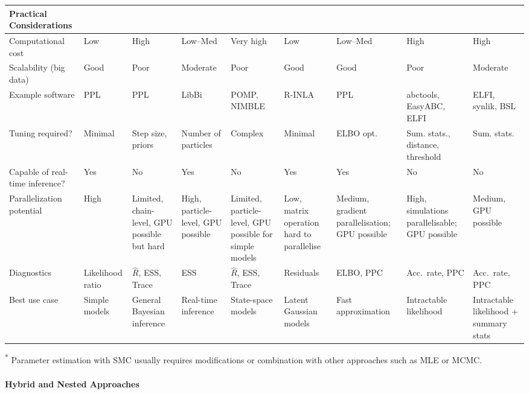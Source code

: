\documentclass{article}
\begin{document}
\begin{landscape}
\begin{table}[ht]
\begin{tabular}{@{}p{3.5cm}p{1.5cm}p{1.5cm}p{2.2cm}p{2.2cm}p{1.5cm}p{1.5cm}p{1.5cm}p{1.5cm}@{}}
\midrule
\textbf{Practical Considerations} & & & & & & & & \\
\midrule
Computational cost & Low & High & Low--Med  & Very high & Low & Low--Med & High & High \\
Scalability (big data) & Good & Poor & Moderate & Poor & Good & Good & Poor & Moderate \\
Example software & PPL & PPL & LibBi  & POMP, NIMBLE & R-INLA & PPL & abctools, EasyABC, ELFI & ELFI, synlik, BSL \\
Tuning required? & Minimal & Step size, priors & Number of particles & Complex & Minimal & ELBO opt. & Sum. stats., distance, threshold & Sum. stats. \\
Capable of real-time inference? & Yes & No & Yes & No & Yes & Yes & No & No \\
Parallelization potential & High & Limited, chain-level, GPU possible but hard & High, particle-level, GPU possible & Limited, particle-level, GPU possible for simple models & Low, matrix operation hard to parallelise & Medium, gradient parallelisation; GPU possible & High, simulations parallelisable; GPU possible & Medium, GPU possible \\
Diagnostics & Likelihood ratio & $\hat{R}$, ESS, Trace & ESS & $\hat{R}$, ESS, Trace & Residuals & ELBO, PPC & Acc.~rate, PPC & Acc.~rate, PPC \\
Best use case & Simple models & General Bayesian inference & Real-time inference & State-space models & Latent Gaussian models & Fast approximation & Intractable likelihood & Intractable likelihood + summary stats \\
\bottomrule
\end{tabular}

\footnotesize{\textsuperscript{*} Parameter estimation with SMC usually requires modifications or combination with other approaches such as MLE or MCMC.}
\end{table}
\end{landscape}



\paragraph{Hybrid and Nested Approaches}
\end{document}
